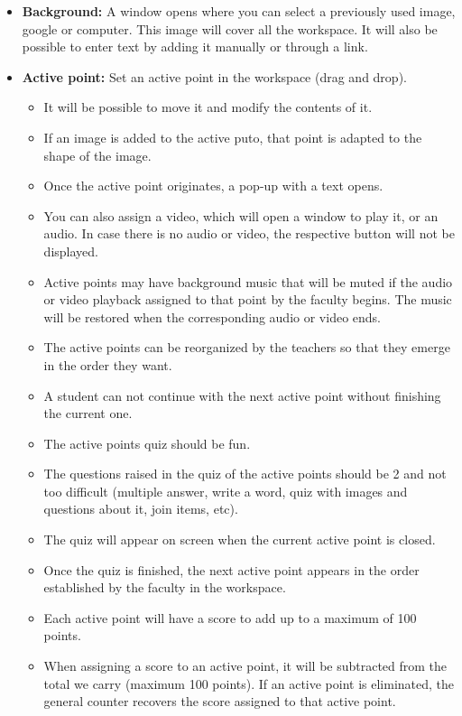 \begin{itemize}
	\item \textbf{Background:} A window opens where you can select a previously used image, google or computer. This image will cover all the workspace. It will also be possible to enter text by adding it manually or through a link.
	\item \textbf{Active point:} Set an active point in the workspace (drag and drop).
	\begin{itemize}
		\item It will be possible to move it and modify the contents of it.
		\item If an image is added to the active puto, that point is adapted to the shape of the image.
		\item Once the active point originates, a pop-up with a text opens.
		\item You can also assign a video, which will open a window to play it, or an audio. In case there is no audio or video, the respective button will not be displayed.
		\item Active points may have background music that will be muted if the audio or video playback assigned to that point by the faculty begins. The music will be restored when the corresponding audio or video ends.
		\item The active points can be reorganized by the teachers so that they emerge in the order they want.
		\item A student can not continue with the next active point without finishing the current one.
		\item The active points quiz should be fun.
		\item The questions raised in the quiz of the active points should be 2 and not too difficult (multiple answer, write a word, quiz with images and questions about it, join items, etc).
		\item The quiz will appear on screen when the current active point is closed.
		\item Once the quiz is finished, the next active point appears in the order established by the faculty in the workspace.
		\item Each active point will have a score to add up to a maximum of 100 points.
		\item When assigning a score to an active point, it will be subtracted from the total we carry (maximum 100 points). If an active point is eliminated, the general counter recovers the score assigned to that active point.

\end{itemize}
\end{itemize}
